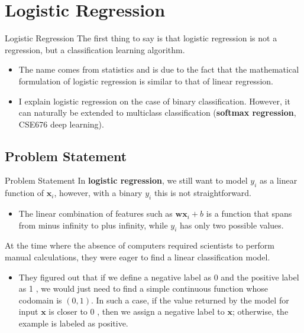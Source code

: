 \documentclass[9pt,dvipsnames]{beamer}
\begin{document}
\section{Logistic Regression}
\begin{frame}{Logistic Regression}
	The first thing to say is that logistic regression is not a regression, but a classification learning algorithm. 
	\begin{itemize}
		\item The name comes from statistics and is due to the fact that the mathematical formulation of logistic regression is similar to that of linear regression.
		\item I explain logistic regression on the case of binary classification. However, it can naturally be extended to multiclass classification (\textbf{softmax regression}, CSE676 deep learning).
	\end{itemize}
\end{frame}

\subsection{Problem Statement}
\begin{frame}{Problem Statement}
	In \textbf{logistic regression}, we still want to model $y_{i}$ as a linear function of $\mathbf{x}_{i}$, however, with a binary $y_{i}$ this is not straightforward. 
	\begin{itemize}
		\item The linear combination of features such as $\mathbf{w} \mathbf{x}_{i}+b$ is a function that spans from minus infinity to plus infinity, while $y_{i}$ has only two possible values.
	\end{itemize}
	
	At the time where the absence of computers required scientists to perform manual calculations, they were eager to find a linear classification model. 
	\begin{itemize}
		\item They figured out that if we define a negative label as 0 and the positive label as 1 , we would just need to find a simple continuous function whose codomain is $(0,1)$. In such a case, if the value returned by the model for input $\mathbf{x}$ is closer to 0 , then we assign a negative label to $\mathbf{x}$; otherwise, the example is labeled as positive.
	\end{itemize}
\end{frame}
\end{document}
